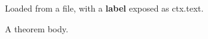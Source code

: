 \begin{warning}[Caution]
Loaded from a file, with a \textbf{label} exposed as ctx.text.
\end{warning}

\begin{theorem}
A theorem body.
\end{theorem}

